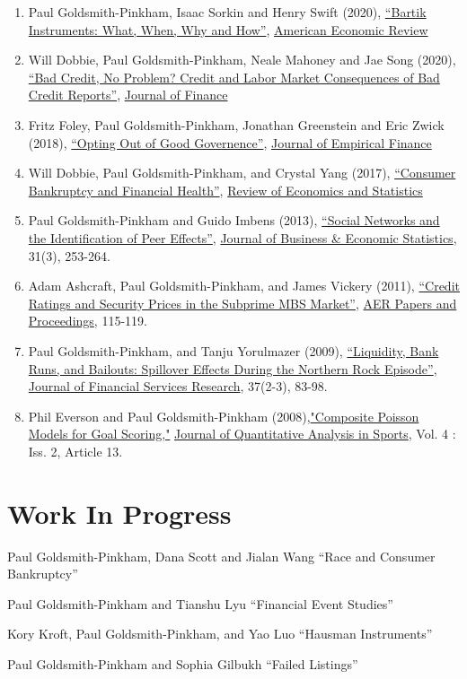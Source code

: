 \documentclass[letterpaper]{article}
\renewenvironment{itemize}{
  \begin{list}{}
    { \setlength{\itemsep}{5pt}
      \setlength{\parsep}{0pt}
      \setlength{\topsep}{0pt}
      \setlength{\leftmargin}{0em} } }{
  \end{list}}
\begin{document}
\begin{enumerate}
\item Paul Goldsmith-Pinkham, Isaac Sorkin and Henry Swift (2020), \href{http://paulgp.github.io/papers/bartik_gpss.pdf}{``Bartik Instruments: What, When, Why and How''}, \ul{American Economic Review}
\item Will Dobbie, Paul Goldsmith-Pinkham, Neale Mahoney and Jae Song (2020), \href{https://papers.ssrn.com/sol3/papers.cfm?abstract_id=2844316}{``Bad Credit, No Problem? Credit and Labor Market Consequences of Bad Credit Reports''}, \ul{Journal of Finance}
\item Fritz Foley, Paul Goldsmith-Pinkham, Jonathan Greenstein and Eric Zwick (2018), \href{http://www.nber.org/papers/w19953}{``Opting Out of Good Governence''}, \ul{Journal of Empirical Finance}
\item Will Dobbie, Paul Goldsmith-Pinkham, and Crystal Yang (2017), \href{http://www.nber.org/papers/w21032}{``Consumer Bankruptcy and Financial Health''}, \ul{Review of Economics and Statistics}
\item Paul Goldsmith-Pinkham and Guido Imbens (2013), \href{http://www.tandfonline.com/doi/pdf/10.1080/07350015.2013.801251}{``Social Networks and the Identification of Peer Effects''}, \ul{Journal of Business \& Economic Statistics}, 31(3), 253-264.
\item Adam Ashcraft, Paul Goldsmith-Pinkham, and James Vickery (2011), \href{http://papers.ssrn.com.ezp-prod1.hul.harvard.edu/sol3/papers.cfm?abstract_id=1856823}{``Credit Ratings
    and Security Prices in the Subprime MBS Market''}, \ul{AER Papers and Proceedings},  115-119. 
\item Paul Goldsmith-Pinkham, and Tanju Yorulmazer (2009), \href{http://www.springerlink.com/content/ww187761jgr660q5/}{``Liquidity, Bank Runs, and Bailouts: Spillover Effects During the Northern Rock Episode''}, \ul{Journal of Financial Services Research}, 37(2-3), 83-98. 
\item Phil Everson and Paul Goldsmith-Pinkham (2008),\href{http://www.bepress.com/jqas/vol4/iss2/13/}{"Composite Poisson Models for Goal Scoring,"} \ul{Journal of Quantitative Analysis in Sports}, Vol. 4 : Iss. 2, Article 13.
\end{enumerate}


\section*{Work In Progress}
\begin{itemize}
\item Paul Goldsmith-Pinkham, Dana Scott and Jialan Wang ``Race and Consumer Bankruptcy''
\item Paul Goldsmith-Pinkham and Tianshu Lyu ``Financial Event Studies''
\item Kory Kroft, Paul Goldsmith-Pinkham, and Yao Luo ``Hausman Instruments''
\item Paul Goldsmith-Pinkham and Sophia Gilbukh ``Failed Listings''
\end{itemize}
\end{document}
